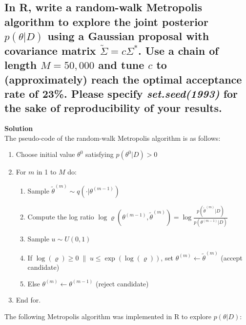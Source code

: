 \documentclass[12pt]{article}
\begin{document}
\subsection{In R, write a random-walk Metropolis algorithm to explore the joint posterior \( p(\theta|D) \) using a Gaussian proposal with covariance matrix \( \tilde{\Sigma} = c\Sigma^* \). Use a chain of length \( M = 50,000 \) and tune \( c \) to (approximately) reach the optimal acceptance rate of 23\%. Please specify \textit{set.seed(1993)} for the sake of reproducibility of your results.}
\textbf{Solution}\\
The pseudo-code of the random-walk Metropolis algorithm is as follows:
\begin{enumerate}
    \item Choose initial value \( \theta^{0} \) satisfying \( p(\theta^{0}|D) > 0 \)
    \item For \( m \) in 1 to \( M \) do:
    \begin{enumerate}
        \item Sample \( \tilde{\theta}^{(m)} \sim q(\cdot|\theta^{(m-1)}) \)
        \item Compute the log ratio \( \log \varrho(\theta^{(m-1)}, \tilde{\theta}^{(m)}) = \log \frac{p(\tilde{\theta}^{(m)}|D)}{p(\theta^{(m-1)}|D)} \)
        \item Sample \( u \sim U(0, 1) \)
        \item If $\log(\varrho) \geq 0 \; \| \; u \leq \exp(\log(\varrho))$, set $\theta^{(m)} \gets \tilde{\theta}^{(m)}$ (accept candidate)
        \item Else \( \theta^{(m)} \leftarrow \theta^{(m-1)} \) (reject candidate)
    \end{enumerate}
    \item End for.
\end{enumerate}

The following Metropolis algorithm was implemented in R to explore \( p(\theta|D) \):
\end{document}
